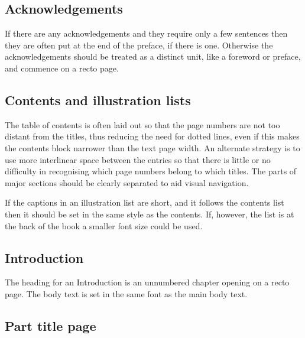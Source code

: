 \documentclass[10pt,a4paper,oneside,extrafontsizes]{memoir}%
\begin{document}
\subsection{Acknowledgements}

\begin{paracol}{2}
\switchEng
    If there are any acknowledgements and they 
require only a few sentences then they are often put at the end of the 
preface, if there is one. Otherwise the acknowledgements
should be treated as a distinct unit, like a foreword or preface, and commence
on a recto page.
\end{paracol}

\subsection{Contents and illustration lists}

\begin{paracol}{2}
\switchEng
    The table of contents is often laid out so 
that the page numbers
are not too distant from the titles, thus reducing the need for dotted lines,
even if this makes the contents block narrower than the text page width. 
An alternate strategy is to use more interlinear space between the entries
so that there is little or no difficulty in recognising which page
numbers belong to which titles. The parts of major sections should be
clearly separated to aid visual navigation.

   If the captions in an illustration list 
are short, and it follows the
contents list then it should be set in the same style as the contents. 
If, however, the list is at the back of the book a smaller font size could 
be used.
\end{paracol}

\subsection{Introduction}

\begin{paracol}{2}
\switchEng
    The heading for an Introduction is an unnumbered
chapter opening on a recto page. The body text is set in the same font 
as the main body text. 
\end{paracol}

\subsection{Part title page}
\end{document}

